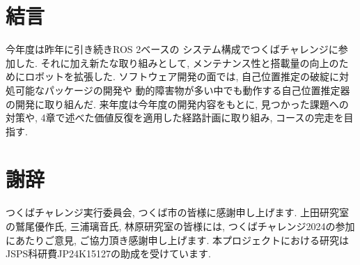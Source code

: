 \documentclass[twocolumn,9pt]{jsproceedings}
\begin{document}


\section{結言}
今年度は昨年に引き続きROS 2ベースの
システム構成でつくばチャレンジに参加した. 
それに加え新たな取り組みとして, 
メンテナンス性と搭載量の向上のためにロボットを拡張した. 
ソフトウェア開発の面では, 自己位置推定の破綻に対処可能なパッケージの開発や
動的障害物が多い中でも動作する自己位置推定器の開発に取り組んだ. 
来年度は今年度の開発内容をもとに, 見つかった課題への対策や, 
4章で述べた価値反復を適用した経路計画に取り組み, 
コースの完走を目指す. 


\section*{謝辞}
つくばチャレンジ実行委員会, つくば市の皆様に感謝申し上げます. 
上田研究室の鷲尾優作氏, 三浦璃音氏, 
林原研究室の皆様には, つくばチャレンジ2024の参加にあたりご意見, ご協力頂き感謝申し上げます. 
本プロジェクトにおける研究はJSPS科研費JP24K15127の助成を受けています. 
\end{document}
